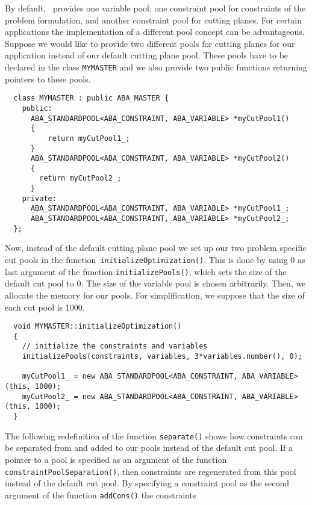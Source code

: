 \noindent
By default, \ABACUS\ provides one variable pool, one constraint pool
for constraints of the problem formulation, and another constraint pool
for cutting planes. For certain applications the implementation of
a different pool concept can be advantageous.
Suppose we would like to provide two different pools for cutting planes
for our application instead of our default cutting plane pool.
These pools have to be declared in the class {\tt MYMASTER} and we also
provide two public functions returning pointers to these pools.
\begin{verbatim}
  class MYMASTER : public ABA_MASTER {
    public:
      ABA_STANDARDPOOL<ABA_CONSTRAINT, ABA_VARIABLE> *myCutPool1() 
      {
          return myCutPool1_;
      }
      ABA_STANDARDPOOL<ABA_CONSTRAINT, ABA_VARIABLE> *myCutPool2() 
      {
        return myCutPool2_;
      }
    private:
      ABA_STANDARDPOOL<ABA_CONSTRAINT, ABA_VARIABLE> *myCutPool1_;
      ABA_STANDARDPOOL<ABA_CONSTRAINT, ABA_VARIABLE> *myCutPool2_;
  };
\end{verbatim}
Now, instead of the default cutting plane pool we set up our two 
problem specific cut 
pools in the 
function~{\tt initializeOptimization()}. This is done
by using 0 as last argument of the function 
{\tt initialize\-Pools()}, which
sets the size of the default cut pool to 0. The size of the variable pool is chosen
arbitrarily. Then, we
allocate the memory for our pools. For simplification, we suppose
that the size of each cut pool is 1000.
\begin{verbatim}
  void MYMASTER::initializeOptimization()
  {
    // initialize the constraints and variables
    initializePools(constraints, variables, 3*variables.number(), 0);

    myCutPool1_ = new ABA_STANDARDPOOL<ABA_CONSTRAINT, ABA_VARIABLE>(this, 1000);
    myCutPool2_ = new ABA_STANDARDPOOL<ABA_CONSTRAINT, ABA_VARIABLE>(this, 1000);
  }
\end{verbatim}
The following redefinition of the function {\tt separate()} shows how
constraints can be separated from and added to our pools instead of the
default cut pool. If a pointer to a pool is specified as an argument of the
function {\tt constraintPoolSeparation()}, then constraints are regenerated
from this pool instead of the default cut pool. By specifying a constraint
pool as the second argument of the function {\tt addCons()} the constraints
